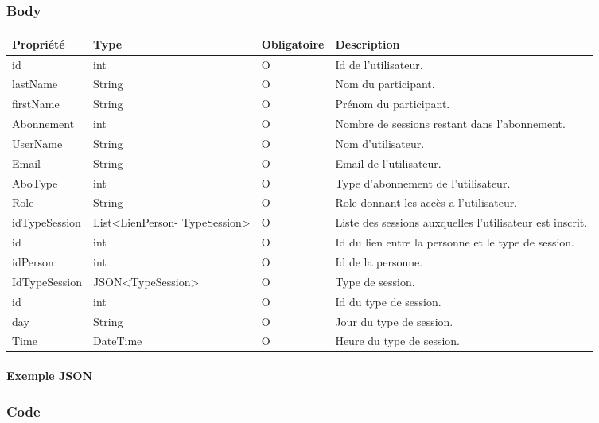 	\subsubsection{Body}
		\begin{center}
			\begin{tabularx}{\textwidth}{| T{0.2122\textwidth} | S{0.22\textwidth} | S{0.15\textwidth} | S{0.3\textwidth} |}
				\hline
				Propriété & Type & Obligatoire & Description \\
				\hline
				id & int & O & Id de l'utilisateur. \\
				\hline
				lastName & String & O & Nom du participant. \\
				\hline
				firstName & String & O & Prénom du participant. \\
				\hline
				Abonnement & int & O & Nombre de sessions restant dans l'abonnement. \\
				\hline
				UserName & String & O & Nom d'utilisateur. \\
				\hline
				Email & String & O & Email de l'utilisateur. \\
				\hline
				AboType & int & O & Type d'abonnement de l'utilisateur. \\
				\hline
				Role & String & O & Role donnant les accès a l'utilisateur. \\ 
				\hline
				idTypeSession & List<LienPerson- TypeSession> & O & Liste des sessions auxquelles l'utilisateur est inscrit. \\
				\hline
				
				\hline
				
				\hline
				id & int & O & Id du lien entre la personne et le type de session. \\ 
				\hline
				idPerson & int & O & Id de la personne. \\
				\hline
				IdTypeSession & JSON<TypeSession> & O & Type de session. \\
				\hline
				
				\hline
				
				\hline
				id & int & O & Id du type de session. \\
				\hline
				day & String & O & Jour du type de session. \\
				\hline
				Time & DateTime & O & Heure du type de session. \\
				\hline

			\end{tabularx}
		\end{center}
		
	\newpage
		\paragraph{Exemple JSON}
			\paragraph{}
			
			
			
	\subsubsection{Code}
		\paragraph{}
